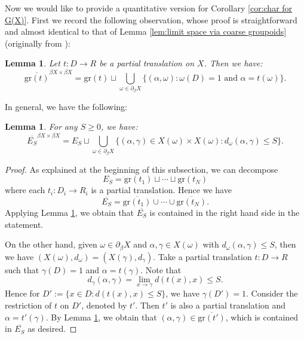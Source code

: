 \documentclass[12pt, a4paper]{amsart}
\numberwithin{equation}{section}
\newtheorem{lem}[thm]{Lemma}
\theoremstyle{definition}
\theoremstyle{remark}
\def\gr{\mathrm{gr}}
\begin{document}
Now we would like to provide a quantitative version for Corollary \ref{cor:char for G(X)}. First we record the following observation, whose proof is straightforward and almost identical to that of Lemma \ref{lem:limit space via coarse groupoids} (originally from \cite[discussion in 10.18-10.24]{Roe03}):

\begin{lem}\label{lem:compatibility via coarse groupoid}
Let $t: D \to R$ be a partial translation on $X$. Then we have:
\[
\overline{\gr(t)}^{\beta X \times \beta X} = \gr(t) \sqcup \bigcup_{\omega \in \partial_\beta X} \big\{(\alpha, \omega): \omega (D) =1 \text{ and } \alpha = t(\omega)\big\}.
\]
\end{lem}

In general, we have the following:

\begin{lem}\label{lem:closure of entourage}
For any $S\geq 0$, we have:
\[
\overline{E_S}^{\beta X \times \beta X} = E_S \sqcup \bigcup_{\omega \in \partial_\beta X} \big\{(\alpha, \gamma)\in X(\omega) \times X(\omega): d_\omega(\alpha, \gamma) \leq S \big\}.
\]
\end{lem}

\begin{proof}
As explained at the beginning of this subsection, we can decompose 
\[
E_S= \gr(t_1) \sqcup \cdots \sqcup \gr(t_N)
\]
where each $t_i: D_i \to R_i$ is a partial translation. Hence we have
\[
\overline{E_S} = \overline{\gr(t_1)} \cup \cdots \cup \overline{\gr(t_N)}.
\]
Applying Lemma \ref{lem:compatibility via coarse groupoid}, we obtain that $\overline{E_S}$ is contained in the right hand side in the statement. 

On the other hand, given $\omega \in \partial_\beta X$ and $\alpha, \gamma \in X(\omega)$ with $d_\omega(\alpha, \gamma) \leq S$, then we have $(X(\omega), d_\omega) = (X(\gamma),d_\gamma)$. Take a partial translation $t: D \to R$ such that $\gamma(D) =1$ and $\alpha = t(\gamma)$. Note that
\[
d_\gamma(\alpha, \gamma) = \lim_{x \to \gamma} d(t(x),x) \leq S.
\]
Hence for $D':=\{x\in D: d(t(x),x) \leq S\}$, we have $\gamma(D')=1$. Consider the restriction of $t$ on $D'$, denoted by $t'$. Then $t'$ is also a partial translation and $\alpha = t'(\gamma)$. By Lemma \ref{lem:compatibility via coarse groupoid}, we obtain that $(\alpha, \gamma) \in \overline{\gr(t')}$, which is contained in $\overline{E_S}$ as desired.
\end{proof}
\end{document}
